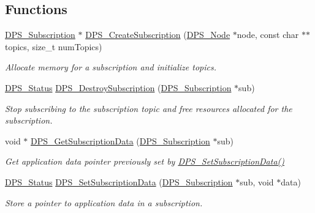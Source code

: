 \subsection*{Functions}
\begin{DoxyCompactItemize}
\item 
\hyperlink{group__subscription_gadb927c4c1b7306867a75fc4288b54af7}{D\+P\+S\+\_\+\+Subscription} $\ast$ \hyperlink{group__subscription_ga4095bb00bd0ca7fa9614ebbc2c28199f}{D\+P\+S\+\_\+\+Create\+Subscription} (\hyperlink{group__node_ga4dd612ab965134321bb57fdb065f121c}{D\+P\+S\+\_\+\+Node} $\ast$node, const char $\ast$$\ast$topics, size\+\_\+t num\+Topics)
\begin{DoxyCompactList}\small\item\em Allocate memory for a subscription and initialize topics. \end{DoxyCompactList}\item 
\hyperlink{group__status_ga30395a84d3cad9d4ec29848106415038}{D\+P\+S\+\_\+\+Status} \hyperlink{group__subscription_gaac78b5690aa31eec642b2a706faac510}{D\+P\+S\+\_\+\+Destroy\+Subscription} (\hyperlink{group__subscription_gadb927c4c1b7306867a75fc4288b54af7}{D\+P\+S\+\_\+\+Subscription} $\ast$sub)
\begin{DoxyCompactList}\small\item\em Stop subscribing to the subscription topic and free resources allocated for the subscription. \end{DoxyCompactList}\item 
void $\ast$ \hyperlink{group__subscription_ga88ab2284734f099ef67bcc60997142b3}{D\+P\+S\+\_\+\+Get\+Subscription\+Data} (\hyperlink{group__subscription_gadb927c4c1b7306867a75fc4288b54af7}{D\+P\+S\+\_\+\+Subscription} $\ast$sub)
\begin{DoxyCompactList}\small\item\em Get application data pointer previously set by \hyperlink{group__subscription_gad581d341003e20c714061e44b57c2009}{D\+P\+S\+\_\+\+Set\+Subscription\+Data()} \end{DoxyCompactList}\item 
\hyperlink{group__status_ga30395a84d3cad9d4ec29848106415038}{D\+P\+S\+\_\+\+Status} \hyperlink{group__subscription_gad581d341003e20c714061e44b57c2009}{D\+P\+S\+\_\+\+Set\+Subscription\+Data} (\hyperlink{group__subscription_gadb927c4c1b7306867a75fc4288b54af7}{D\+P\+S\+\_\+\+Subscription} $\ast$sub, void $\ast$data)
\begin{DoxyCompactList}\small\item\em Store a pointer to application data in a subscription. \end{DoxyCompactList}\item 
$$
\end{DoxyCompactItemize}
